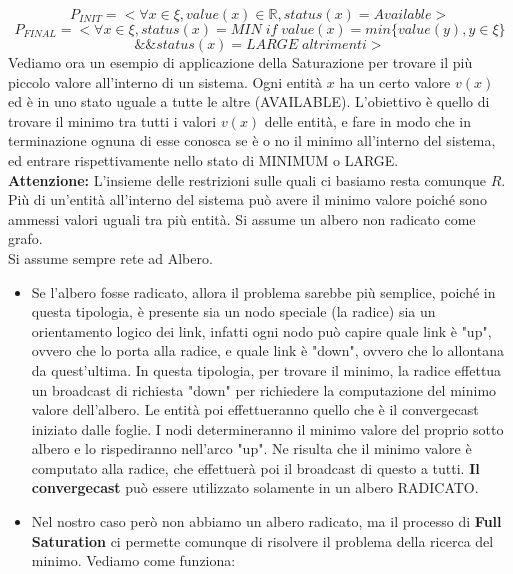 $$P_{INIT} = < \forall x \in \xi, value(x) \in \mathbb{R}, status(x) =
    Available>$$
$$
    P_{FINAL} =   <
    \forall x \in \xi, status(x)= MIN \; if \; value(x) = min
    \{value(y), y \in \xi \}$$$$ \&\&  status(x) = LARGE \;altrimenti >$$
Vediamo ora un esempio di applicazione della Saturazione per trovare il più
piccolo valore all'interno di un sistema. Ogni entità $x$ ha un certo valore
$v(x)$ ed è in uno stato uguale a tutte le altre (AVAILABLE). L'obiettivo è
quello di trovare il minimo tra tutti i valori $v(x)$ delle entità, e fare in
modo che in terminazione ognuna di esse conosca se è o no il minimo all'interno
del sistema, ed entrare rispettivamente nello stato di MINIMUM o LARGE.\\
\textbf{Attenzione:} L'insieme delle restrizioni sulle quali ci basiamo resta
comunque $R$. Più di un'entità all'interno del sistema può avere il minimo
valore poiché sono ammessi valori uguali tra più entità. Si assume un albero non
radicato come grafo.\\
Si assume sempre rete ad Albero.
\begin{itemize}
    \item Se l'albero fosse radicato, allora il problema sarebbe più semplice,
          poiché in questa tipologia, è presente sia un nodo speciale (la radice) sia un
          orientamento logico dei link, infatti ogni nodo può capire quale link è "up",
          ovvero che lo porta alla radice, e quale link è "down", ovvero che lo
          allontana da quest'ultima. In questa tipologia, per trovare il minimo, la
          radice effettua un broadcast di richiesta "down" per richiedere la
          computazione del minimo valore dell'albero. Le entità poi effettueranno quello
          che è il convergecast iniziato dalle foglie. I nodi determineranno il minimo
          valore del proprio sotto albero e lo rispediranno nell'arco "up". Ne risulta
          che il minimo valore è computato alla radice, che effettuerà poi il broadcast
          di questo a tutti. \textbf{Il convergecast} può essere utilizzato solamente in
          un albero RADICATO.
    \item Nel nostro caso però non abbiamo un albero radicato, ma il processo di
          \textbf{Full Saturation} ci permette comunque di risolvere il problema della
          ricerca del minimo. Vediamo come funziona:
\end{itemize}

